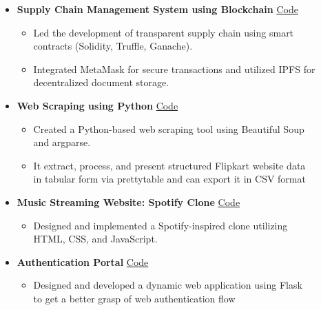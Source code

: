 \documentclass[10pt,a4paper,ragged2e,withhyper]{altacv}
\begin{document}
\begin{paracol}{2}
\divider



\begin{itemize}
    \item {\color{black} \normalsize \textbf{Supply Chain Management System using Blockchain}} \hfill {\color{accent} \faGithub \href{https://github.com/atharao/Supply-Chain-Management-using-Blockchain}{ \hspace{0.5mm}Code}}
    \begin{itemize}
        \item Led the development of transparent supply chain using smart \\contracts (Solidity, Truffle, Ganache). 
        \item Integrated MetaMask for secure transactions and utilized IPFS for\\ decentralized document storage.
    \end{itemize}

    \item {\color{black} \normalsize \textbf{Web Scraping using Python}} \hfill {\color{accent} \faGithub \href{https://github.com/atharao/Flipkart_Scraper}{ \hspace{0.5mm}Code}}
    \begin{itemize}
        \item Created a Python-based web scraping tool using Beautiful Soup \\and argparse.
        \item It extract, process, and present structured Flipkart website data \\in tabular form via prettytable and can export it in CSV format
    \end{itemize}

    \item {\color{black} \normalsize \textbf{Music Streaming Website: Spotify Clone}} \hfill {\color{accent} \faGithub \href{https://github.com/atharao/Spotify_Clone}{ \hspace{0.5mm}Code}}
    \begin{itemize}
        \item  Designed and implemented a Spotify-inspired clone utilizing \\HTML, CSS, and JavaScript.
    \end{itemize}
    
    \item {\color{black} \normalsize \textbf{Authentication Portal}} \hfill {\color{accent} \faGithub \href{https://github.com/atharao/Login-registration-portal-updated}{ \hspace{0.5mm}Code}}
    \begin{itemize}
        \item Designed and developed a dynamic web application using Flask \\to get a better grasp of web authentication flow
    \end{itemize}
\end{itemize}



\end{paracol}
\end{document}
